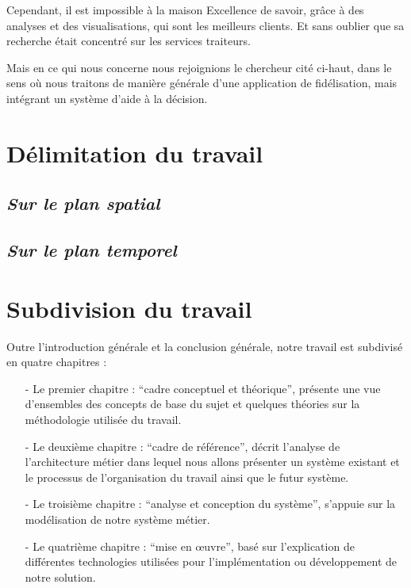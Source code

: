 \documentclass[a4paper,12pt,oneside]{book}
\begin{document}
    Cependant, il est impossible à la maison Excellence de savoir, grâce à des analyses et des visualisations, qui
    sont les meilleurs clients. Et sans oublier que sa recherche était concentré sur les services traiteurs. 
    \newline

    Mais en ce qui nous concerne nous rejoignions le chercheur cité ci-haut, dans le sens où nous traitons de manière
    générale d’une application de fidélisation, mais intégrant un système d’aide à la décision.
    \section[Délimitation du travail]{Délimitation du travail}
        \subsection[Sur le plan spatial]{\textit{Sur le plan spatial}}

        \subsection[Sur le plan temporel]{\textit{Sur le plan temporel}}
    
    \section[Subdivision du travail]{Subdivision du travail}
    Outre l’introduction générale et la conclusion générale, notre travail est subdivisé
    en quatre chapitres :
    \newline
        \begin{itemize}
            \item [-] Le premier chapitre : \enquote{cadre conceptuel et théorique}, présente une vue
            d’ensembles des concepts de base du sujet et quelques théories sur la méthodologie
            utilisée du travail.
            \newline
            \item [-] Le deuxième chapitre : \enquote{cadre de référence}, décrit l’analyse de l’architecture
            métier dans lequel nous allons présenter un système existant et le processus de
            l’organisation du travail ainsi que le futur système.
            \newline       
            \item [-] Le troisième chapitre : \enquote{analyse et conception du système}, s’appuie sur la
            modélisation de notre système métier.
            \newline
            \item [-]Le quatrième chapitre : \enquote{mise en œuvre}, basé sur l’explication de différentes
            technologies utilisées pour l’implémentation ou développement de notre solution.            
        \end{itemize}

    \printbibliography
\end{document}

